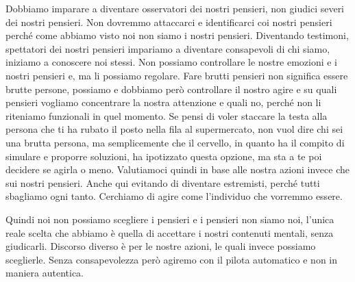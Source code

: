\documentclass[12pt]{book} %
\begin{document}
Dobbiamo imparare a diventare osservatori dei nostri pensieri, non giudici severi dei nostri pensieri. Non dovremmo
attaccarci e identificarci coi nostri pensieri perché come abbiamo visto noi non siamo i nostri pensieri. Diventando
testimoni, spettatori dei nostri pensieri impariamo a diventare consapevoli di chi siamo, iniziamo a conoscere noi
stessi. Non possiamo controllare le nostre emozioni e i nostri pensieri e, ma li possiamo regolare. Fare brutti
pensieri non significa essere brutte persone, possiamo e dobbiamo però controllare il nostro agire e su quali pensieri
vogliamo concentrare la nostra attenzione e quali no, perché non li riteniamo funzionali in quel momento. Se pensi di
voler staccare la testa alla persona che ti ha rubato il posto nella fila al supermercato, non vuol dire chi sei una
brutta persona, ma semplicemente che il cervello, in quanto ha il compito di simulare e proporre soluzioni, ha
ipotizzato questa opzione, ma sta a te poi decidere se agirla o meno. Valutiamoci quindi in base alle nostra azioni
invece che sui nostri pensieri. Anche qui evitando di diventare estremisti, perché tutti sbagliamo ogni tanto.
Cerchiamo di agire come l'individuo che vorremmo essere.

Quindi noi non possiamo scegliere i pensieri e i pensieri non siamo noi, l'unica reale scelta che
abbiamo è quella di accettare i nostri contenuti mentali, senza giudicarli. Discorso diverso è per le nostre azioni, le
quali invece possiamo sceglierle. Senza consapevolezza però agiremo con il pilota automatico e non in maniera
autentica.
\end{document}
